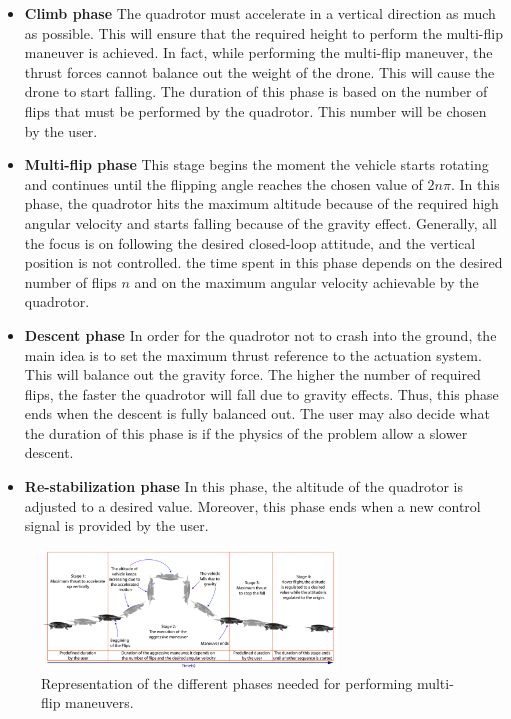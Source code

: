 \documentclass{thesisreport}
\begin{document}
\begin{itemize}
\setlength{\itemindent}{-.5in}
	\item [] \textbf{Climb phase} The quadrotor must accelerate in a vertical direction as much as possible. This will ensure that the required height to perform the multi-flip maneuver is achieved. In fact, while performing the multi-flip maneuver, the thrust forces cannot balance out the weight of the drone. This will cause the drone to start falling. The duration of this phase is based on the number of flips that must be performed by the quadrotor. This number will be chosen by the user.

	\item[] \textbf{Multi-flip phase} This stage begins the moment the vehicle starts rotating and continues until the flipping angle reaches the chosen value of $2n \pi$. In this phase, the quadrotor hits the maximum altitude because of the required high angular velocity and starts falling because of the gravity effect. Generally, all the focus is on following the desired closed-loop attitude, and the vertical position is not controlled. the time spent in this phase depends on the desired number of flips $n$ and on the maximum angular velocity achievable by the quadrotor.
	
	\item [] \textbf{Descent phase} In order for the quadrotor not to crash into the ground, the main idea is to set the maximum thrust reference to the actuation system. This will balance out the gravity force. The higher the number of required flips, the faster the quadrotor will fall due to gravity effects. Thus, this phase ends when the descent is fully balanced out. The user may also decide what the duration of this phase is if the physics of the problem allow a slower descent.
	\item [] \textbf{Re-stabilization phase} In this phase, the altitude of the quadrotor is adjusted to a desired value. Moreover, this phase ends when a new control signal is provided by the user. 
\end{itemize}

\begin{figure}[h]
\centering
\includegraphics[width=0.7\textwidth]{Images/Flip/Physics}
\caption{Representation of the different phases needed for performing multi-flip maneuvers\cite{Castillo2018}.}
\label{flipping_physics}
\end{figure}
\end{document}
